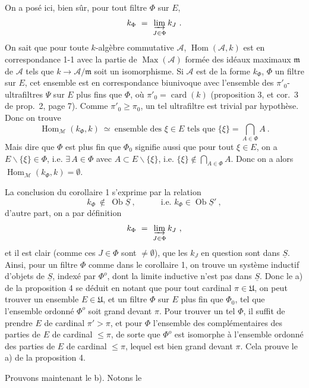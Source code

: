 On a posé ici, bien sûr, pour tout filtre $\Phi$ sur $E$,
\[
k_\Phi\ =\ \limind_{J\in\Phi}k_J\ .
\]
On sait que pour toute $k$-algèbre commutative $\mathcal{A}$, $\operatorname{Hom}(\mathcal{A},k)$ est en correspondance 1-1 avec la partie de $\operatorname{Max}(\mathcal{A})$ formée des idéaux maximaux $\mathfrak{m}$ de $\mathcal{A}$ tels que $k\longrightarrow\mathcal{A}/\mathfrak{m}$ soit un isomorphisme. Si $\mathcal{A}$ est de la forme $k_\Phi$, $\Phi$ un filtre sur $E$, cet ensemble est en correspondance biunivoque avec l'ensemble des $\pi'_0$-ultrafiltres $\Psi$ sur $E$ plus fins que $\Phi$, où $\pi'_0=\operatorname{card}(k)$ (proposition 3, et cor.~3 de prop.~2, page 7). Comme $\pi'_0\geqslant\pi_0$, un tel ultrafiltre est trivial par hypothèse. Donc on trouve
\[
\operatorname{Hom}_{\mathcal{M}}(k_\Phi,k)\ \simeq\ \text{ensemble des } \xi\in E \text{ tels que } \{\xi\}=\textstyle\bigcap_{A\in\Phi}A\ . \tag*{$(*)$}
\]
Mais dire que $\Phi$ est plus fin que $\Phi_0$ signifie aussi que pour tout $\xi\in E$, on a $E\backslash\{\xi\}\in\Phi$, i.e. $\exists\,A\in\Phi$ avec $A\subset E\backslash\{\xi\}$, i.e. $\{\xi\}\notin\bigcap_{A\in\Phi}A$. Donc on a alors $\operatorname{Hom}_{\mathcal{M}}(k_\Phi,k)=\emptyset$.

La conclusion du corollaire 1 s'exprime par la relation
\[
k_\Phi\ \notin\ \operatorname{Ob}\underline{S}\ ,\qquad\quad \text{i.e. } k_\Phi\in\operatorname{Ob}\underline{S}'\ ,
\]
d'autre part, on a par définition
\[
k_\Phi\ =\ \limind_{J\in\Phi}k_J\ ,
\]
et il est clair (comme ces $J\in\Phi$ sont $\neq\emptyset$), que les $k_J$ en question sont dans $\underline{S}$. Ainsi, pour un filtre $\Phi$ comme dans le corollaire 1, on trouve un système inductif d'objets de $\underline{S}$, indexé par $\Phi^o$, dont la limite inductive n'est pas dans $\underline{S}$. Donc le a) de la proposition 4 se déduit en notant que pour tout cardinal $\pi\in\mathfrak{U}$, on peut trouver un ensemble $E\in\mathfrak{U}$, et un filtre $\Phi$ sur $E$ plus fin que $\Phi_0$, tel que l'ensemble ordonné $\Phi^o$ soit grand devant $\pi$. Pour trouver un tel $\Phi$, il suffit de prendre $E$ de cardinal $\pi'>\pi$, et pour $\Phi$ l'ensemble
des complémentaires des parties de $E$ de cardinal $\leqslant\pi$, de sorte que $\Phi^o$ est isomorphe à l'ensemble ordonné des parties de $E$ de cardinal $\leqslant\pi$, lequel est bien grand devant $\pi$. Cela prouve le a) de la proposition 4.

Prouvons maintenant le b). Notons le

